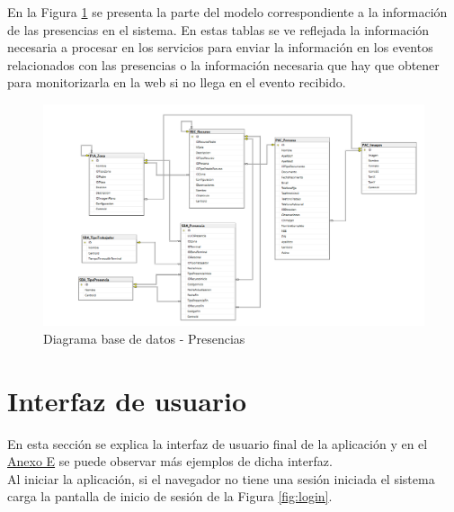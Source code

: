 \newpage
En la Figura \ref{fig:Diagrama-BD-Presencias} se presenta la parte del modelo correspondiente a la información de las presencias en el sistema. En estas tablas se ve reflejada la información necesaria a procesar en los servicios para enviar la información en los eventos relacionados con las presencias o la información necesaria que hay que obtener para monitorizarla en la web si no llega en el evento recibido.

\begin{figure}[H]
    \centering
    \includegraphics[width=16cm]{Imagenes/Diagrama-BD-Presencias}
    \caption{Diagrama base de datos - Presencias}
    \label{fig:Diagrama-BD-Presencias}
\end{figure}


\section{Interfaz de usuario}
\label{section-ui}

En esta sección se explica la interfaz de usuario final de la aplicación y en el \hyperref[anexo-e]{Anexo E} se puede observar más ejemplos de dicha interfaz.\\


Al iniciar la aplicación, si el navegador no tiene una sesión iniciada el sistema carga la pantalla de inicio de sesión de la Figura \ref{fig:login}. \\ 

